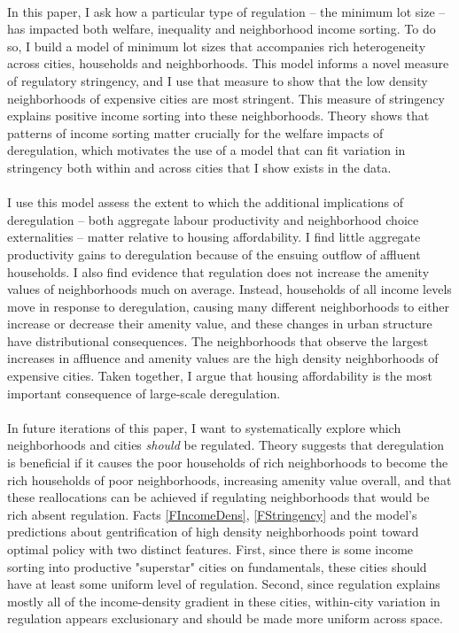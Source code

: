 \documentclass[12pt]{article}
\begin{document}
\paragraph*{}
	In this paper, I ask how a particular type of regulation -- the minimum lot size -- has impacted both welfare, inequality and neighborhood income sorting. To do so, I build a model of minimum lot sizes that accompanies rich heterogeneity across cities, households and neighborhoods. This model informs a novel measure of regulatory stringency, and I use that measure to show that the low density neighborhoods of expensive cities are most stringent. This measure of stringency explains positive income sorting into these neighborhoods. Theory shows that patterns of income sorting matter crucially for the welfare impacts of deregulation, which motivates the use of a model that can fit variation in stringency both within and across cities that I show exists in the data.
	
	\paragraph*{}
	I use this model assess the extent to which the additional implications of deregulation -- both aggregate labour productivity and neighborhood choice externalities -- matter relative to housing affordability. I find little aggregate productivity gains to deregulation because of the ensuing outflow of affluent households. I also find evidence that regulation does not increase the amenity values of neighborhoods much on average. Instead, households of all income levels move in response to deregulation, causing many different neighborhoods to either increase or decrease their amenity value, and these changes in urban structure have distributional consequences. The neighborhoods that observe the largest increases in affluence and amenity values are the high density neighborhoods of expensive cities. Taken together, I argue that housing affordability is the most important consequence of large-scale deregulation. 
	
\paragraph*{}
	In future iterations of this paper, I want to systematically explore which neighborhoods and cities \textit{should} be regulated. Theory suggests that deregulation is beneficial if it causes the poor households of rich neighborhoods to become the rich households of poor neighborhoods, increasing amenity value overall, and that these reallocations can be achieved if regulating neighborhoods that would be rich absent regulation. Facts \ref{FIncomeDens}, \ref{FStringency} and the model's predictions about gentrification of high density neighborhoods point toward optimal policy with two distinct features. First, since there is some income sorting into productive "superstar" cities on fundamentals, these cities should have at least some uniform level of regulation. Second, since regulation explains mostly all of the income-density gradient in these cities, within-city variation in regulation appears exclusionary and should be made more uniform across space. 
	
\end{document}
